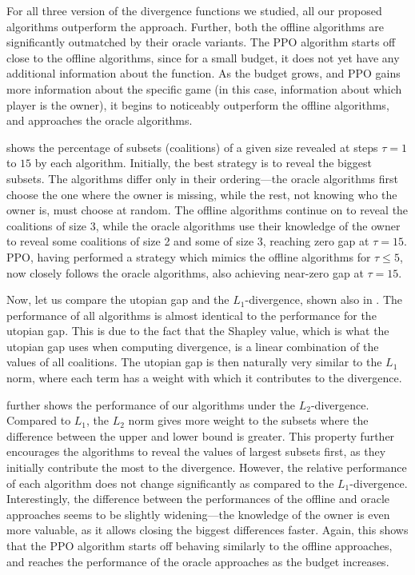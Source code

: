 For all three version of the divergence functions we studied, all our proposed algorithms outperform the \algRand{} approach.
Further, both the offline algorithms are significantly outmatched by their oracle variants.
The PPO algorithm starts off close to the offline algorithms, since for a small budget, it does not yet have any additional information about the function.
As the budget grows, and PPO gains more information about the specific game (in this case, information about which player is the owner), it begins to noticeably outperform the offline algorithms, and approaches the oracle algorithms.

 shows the percentage of subsets (coalitions) of a given size revealed at steps $ \tau= 1 $ to $ 15 $ by each algorithm.
Initially, the best strategy is to reveal the biggest subsets.
The algorithms differ only in their ordering---the oracle algorithms first choose the one where the owner is missing, while the rest, not knowing who the owner is, must choose at random.
The offline algorithms continue on to reveal the coalitions of size $ 3 $, while the oracle algorithms use their knowledge of the owner to reveal some coalitions of size 2 and some of size 3, reaching zero gap at $ \tau=15 $.
PPO, having performed a strategy which mimics the offline algorithms for $ \tau \leq 5 $, now closely follows the oracle algorithms, also achieving near-zero gap at $ \tau=15 $.

Now, let us compare the utopian gap and the $ L_1 $-divergence, shown also in .
The performance of all algorithms is almost identical to the performance for the utopian gap.
This is due to the fact that the Shapley value, which is what the utopian gap uses when computing divergence, is a linear combination of the values of all coalitions.
The utopian gap is then naturally very similar to the $ L_1 $ norm, where each term has a weight with which it contributes to the divergence.

 further shows the performance of our algorithms under the $ L_2 $-divergence.
Compared to $ L_1 $, the $ L_2 $ norm gives more weight to the subsets where the difference between the upper and lower bound is greater.
This property further encourages the algorithms to reveal the values of largest subsets first, as they initially contribute the most to the divergence.
However, the relative performance of each algorithm does not change significantly as compared to the $ L_1 $-divergence.
Interestingly, the difference between the performances of the offline and oracle approaches seems to be slightly widening---the knowledge of the owner is even more valuable, as it allows closing the biggest differences faster.
Again, this shows that the PPO algorithm starts off behaving similarly to the offline approaches, and reaches the performance of the oracle approaches as the budget increases.

